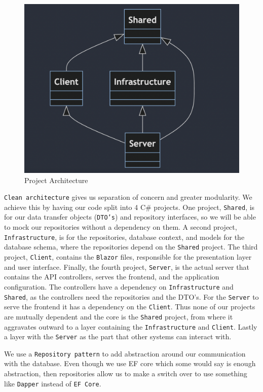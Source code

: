 \begin{figure}
    \includegraphics[width=0.9\linewidth]{Images/onionStructure.png} 
    \caption{Project Architecture}
    \label{fig:projectDependencyGraph}
\end{figure}

\texttt{Clean architecture} gives us separation of concern and greater modularity. We achieve this by having our code split into 4 C\# projects. One project, \texttt{Shared}, is for our data transfer objects (\texttt{DTO's}) and repository interfaces, so we will be able to mock our repositories without a dependency on them. A second project, \texttt{Infrastructure}, is for the repositories, database context, and models for the database schema, where the repositories depend on the \texttt{Shared} project. The third project, \texttt{Client}, contains the \texttt{Blazor} files, responsible for the presentation layer and user interface. Finally, the fourth project, \texttt{Server}, is the actual server that contains the API controllers, serves the frontend, and the application configuration. The controllers have a dependency on \texttt{Infrastructure} and \texttt{Shared}, as the controllers need the repositories and the DTO's. For the \texttt{Server} to serve the frontend it has a dependency on the \texttt{Client}. Thus none of our projects are mutually dependent and the core is the \texttt{Shared} project, from where it aggravates outward to a layer containing the \texttt{Infrastructure} and \texttt{Client}. Lastly a layer with the \texttt{Server} as the part that other systems can interact with.

We use a \texttt{Repository pattern} to add abstraction around our communication with the database. Even though we use EF core which some would say is enough abstraction, then repositories allow us to make a switch over to use something like \texttt{Dapper} instead of \texttt{EF Core}.

